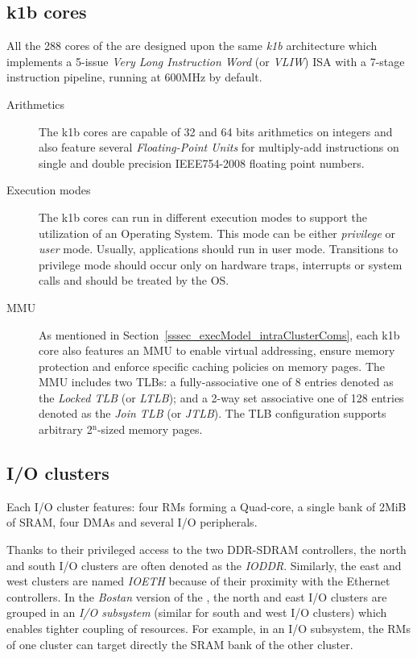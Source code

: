 \documentclass[main.tex]{subfiles}
\begin{document}
\subsection{k1b cores}
All the 288 cores of the \mppalong are designed upon the same \emph{k1b} architecture which implements a 5-issue \emph{Very Long Instruction Word} (or \emph{VLIW}) ISA with a 7-stage instruction pipeline, running at 600MHz by default. 

\begin{description}
    \item[Arithmetics]
        The k1b cores are capable of 32 and 64 bits arithmetics on integers and also feature several \emph{Floating-Point Units} for multiply-add instructions on single and double precision IEEE754-2008 floating point numbers.

    \item[Execution modes]
        The k1b cores can run in different execution modes to support the utilization of an Operating System. This mode can be either \emph{privilege} or \emph{user} mode. Usually, applications should run in user mode. Transitions to privilege mode should occur only on hardware traps, interrupts or system calls and should be treated by the OS.

    \item[MMU]
        As mentioned in Section~\ref{sssec_execModel_intraClusterComs}, each k1b core also features an MMU to enable virtual addressing, ensure memory protection and enforce specific caching policies on memory pages. The MMU includes two TLBs: a fully-associative one of 8 entries denoted as the \emph{Locked TLB} (or \emph{LTLB}); and a 2-way set associative one of 128 entries denoted as the \emph{Join TLB} (or \emph{JTLB}). The TLB configuration supports arbitrary 2$^{\text{n}}$-sized memory pages.
\end{description}



\subsection{I/O clusters}
Each I/O cluster features: four RMs forming a Quad-core, a single bank of 2MiB of SRAM, four DMAs and several I/O peripherals.

Thanks to their privileged access to the two DDR-SDRAM controllers, the north and south I/O clusters are often denoted as the \emph{IODDR}. Similarly, the east and west clusters are named \emph{IOETH} because of their proximity with the Ethernet controllers. In the \emph{Bostan} version of the \mppalong, the north and east I/O clusters are grouped in an \emph{I/O subsystem} (similar for south and west I/O clusters) which enables tighter coupling of resources. For example, in an I/O subsystem, the RMs of one cluster can target directly the SRAM bank of the other cluster.
\end{document}
